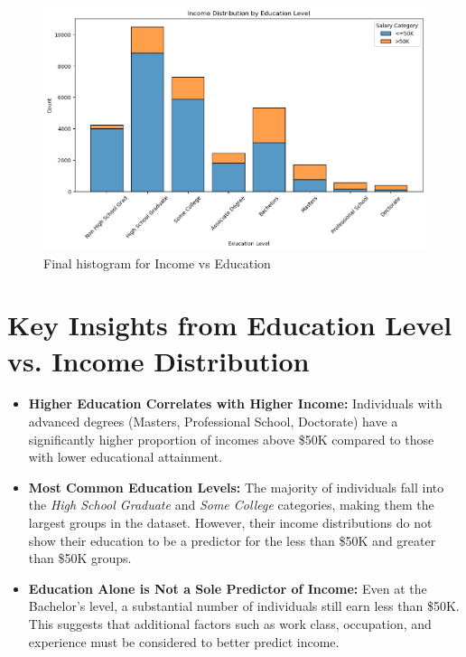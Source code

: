 \documentclass[journal,onecolumn]{IEEEtran}
\begin{document}
\begin{figure}[h]
    \centering
    \includegraphics[width=1\linewidth]{hist_4.png}  %
    \caption{Final histogram for Income vs Education}
    \label{fig:final_income_vs_education}
\end{figure}
\section{Key Insights from Education Level vs. Income Distribution}

\begin{itemize}
    \item \textbf{Higher Education Correlates with Higher Income:} Individuals with advanced degrees (Masters, Professional School, Doctorate) have a significantly higher proportion of incomes above \$50K compared to those with lower educational attainment.
    
    \item \textbf{Most Common Education Levels:} The majority of individuals fall into the \textit{High School Graduate} and \textit{Some College} categories, making them the largest groups in the dataset. However, their income distributions do not show their education to be a predictor for the less than \$50K and greater than \$50K groups.
    
    \item \textbf{Education Alone is Not a Sole Predictor of Income:} Even at the Bachelor's level, a substantial number of individuals still earn less than \$50K. This suggests that additional factors such as work class, occupation, and experience must be considered to better predict income.
\end{itemize}
\end{document}
